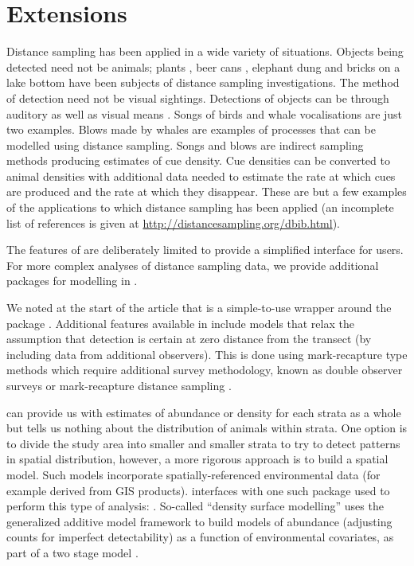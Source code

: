 \documentclass[article]{jss}\usepackage[]{graphicx}\usepackage[]{color}
\begin{document}
\section{Extensions}

Distance sampling has been applied in a wide variety of situations. Objects being detected need not be animals; plants \citep{Buckland:2007kl}, beer cans \citep{Otto:1990gs}, elephant dung \citep{NchPlu01} and bricks on a lake bottom \citep{Ber90} have been subjects of distance sampling investigations. The method of detection need not be visual sightings. Detections of objects can be through auditory as well as visual means \citep{Marques2013b}. Songs of birds \citep{Buckland2006} and whale vocalisations \citep{BorSub1} are just two examples. Blows made by whales are examples of processes that can be modelled using distance sampling. Songs and blows are indirect sampling methods producing estimates of cue density. Cue densities can be converted to animal densities with additional data needed to estimate the rate at which cues are produced and the rate at which they disappear. These are but a few examples of the applications to which distance sampling has been applied (an incomplete list of references is given at \url{http://distancesampling.org/dbib.html}).

The features of  are deliberately limited to provide a simplified interface for users. For more complex analyses of distance sampling data, we provide additional packages for modelling in .

We noted at the start of the article that  is a simple-to-use wrapper around the package . Additional features available in  include  models that relax the assumption that detection is certain at zero distance from the transect (by including data from additional observers). This is done using mark-recapture type methods which require additional survey methodology, known as double observer surveys or mark-recapture distance sampling \citep[see][for an introduction]{Burt:2014gu}.

 can provide us with estimates of abundance or density for each strata as a whole but tells us nothing about the distribution of animals within strata. One option is to divide the study area into smaller and smaller strata to try to detect patterns in spatial distribution, however, a more rigorous approach is to build a spatial model. Such models incorporate spatially-referenced environmental data (for example derived from GIS products).  interfaces with one such package used to perform this type of analysis:  \citep{dsm-pkg}. So-called ``density surface modelling'' uses the generalized additive model framework \citep[e.g.][]{Wood:2006vg} to build models of abundance (adjusting counts for imperfect detectability) as a function of environmental covariates, as part of a two stage model \citep{Hedley:2004et, Miller:2013fq}.
\end{document}
